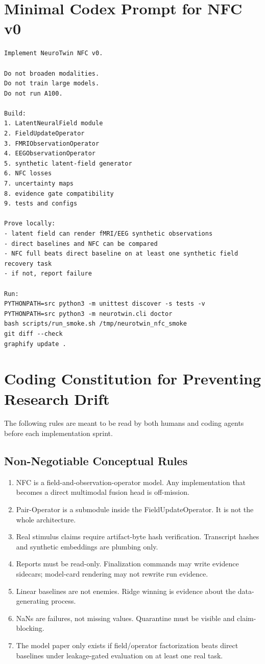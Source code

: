 \documentclass[11pt]{article}
\begin{document}
\appendix
\section{Minimal Codex Prompt for NFC v0}

\begin{lstlisting}
Implement NeuroTwin NFC v0.

Do not broaden modalities.
Do not train large models.
Do not run A100.

Build:
1. LatentNeuralField module
2. FieldUpdateOperator
3. FMRIObservationOperator
4. EEGObservationOperator
5. synthetic latent-field generator
6. NFC losses
7. uncertainty maps
8. evidence gate compatibility
9. tests and configs

Prove locally:
- latent field can render fMRI/EEG synthetic observations
- direct baselines and NFC can be compared
- NFC full beats direct baseline on at least one synthetic field recovery task
- if not, report failure

Run:
PYTHONPATH=src python3 -m unittest discover -s tests -v
PYTHONPATH=src python3 -m neurotwin.cli doctor
bash scripts/run_smoke.sh /tmp/neurotwin_nfc_smoke
git diff --check
graphify update .
\end{lstlisting}


\section{Coding Constitution for Preventing Research Drift}

The following rules are meant to be read by both humans and coding agents before each implementation sprint.

\subsection{Non-Negotiable Conceptual Rules}
\begin{enumerate}
\item NFC is a field-and-observation-operator model. Any implementation that becomes a direct multimodal fusion head is off-mission.
\item Pair-Operator is a submodule inside the FieldUpdateOperator. It is not the whole architecture.
\item Real stimulus claims require artifact-byte hash verification. Transcript hashes and synthetic embeddings are plumbing only.
\item Reports must be read-only. Finalization commands may write evidence sidecars; model-card rendering may not rewrite run evidence.
\item Linear baselines are not enemies. Ridge winning is evidence about the data-generating process.
\item NaNs are failures, not missing values. Quarantine must be visible and claim-blocking.
\item The model paper only exists if field/operator factorization beats direct baselines under leakage-gated evaluation on at least one real task.
\end{enumerate}
\end{document}
